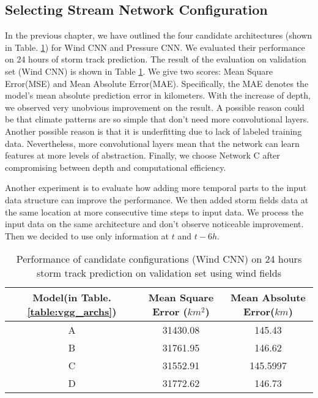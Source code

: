 \subsection{Selecting Stream Network Configuration}
In the previous chapter, we have outlined the four candidate architectures (shown in Table. \ref{table:arch_evaluation}) for Wind CNN and Pressure CNN. We evaluated their performance on 24 hours of storm track prediction. The result of the evaluation on validation set (Wind CNN) is shown in Table \ref{table:arch_evaluation}. We give two scores: Mean Square Error(MSE) and Mean Absolute Error(MAE). Specifically, the MAE denotes the model's mean absolute prediction error in kilometers. With the increase of depth, we observed very unobvious improvement on the result. A possible reason could be that climate patterns are so simple that don't need more convolutional layers. Another possible reason is that it is underfitting due to lack of labeled training data. Nevertheless, more convolutional layers mean that the network can learn features at more levels of abstraction. Finally, we choose Network C after compromising between depth and computational efficiency.

Another experiment is to evaluate how adding more temporal parts to the input data structure can improve the performance. We then added storm fields data at the same location at more consecutive time steps to input data. We process the input data on the same architecture and don't observe noticeable improvement. Then we decided to use only information at $t$ and $t-6h$. 

\begin{table}[]
	\centering
	\caption{Performance of candidate configurations (Wind CNN) on 24 hours storm track prediction on validation set using wind fields}
	\label{table:arch_evaluation}
	\begin{tabular}{|c|c|c|}
		\hline
		Model(in Table. \ref{table:vgg_archs}) & Mean Square Error ($km^2$) & Mean Absolute Error($km$) \\ \hline
		A & 31430.08 & 145.43  \\ \hline
		B & 31761.95 & 146.62  \\ \hline
		C & 31552.91 & 145.5997 \\ \hline
		D & 31772.62 & 146.73 \\ \hline
		
	
	\end{tabular}
\end{table}




